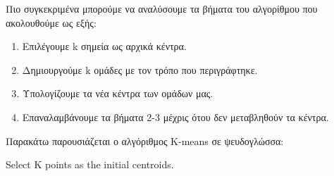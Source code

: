 Πιο συγκεκριμένα μπορούμε να αναλύσουμε τα βήματα του αλγορίθμου που ακολουθούμε ως εξής:
\begin{enumerate}
    \item Επιλέγουμε k σημεία ως αρχικά κέντρα.
    \item Δημιουργούμε k ομάδες με τον τρόπο που περιγράφτηκε.
    \item Υπολογίζουμε τα νέα κέντρα των ομάδων μας.
    \item Επαναλαμβάνουμε τα βήματα 2-3 μέχρις ότου δεν μεταβληθούν τα κέντρα.
\end{enumerate}

Παρακάτω παρουσιάζεται ο αλγόριθμος K-means σε ψευδογλώσσα:\\
\begin{minipage}{\linewidth}
\begin{algorithm}[H]
    Select K points as the initial centroids.\;
\end{algorithm}
\end{minipage}

